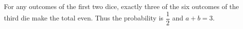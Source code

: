 For any outcomes of the first two dice, exactly three of the six outcomes of the third die make the total even. Thus the probability is $\dfrac{1}{2}$ and $\boxed{a+b=3}$.
